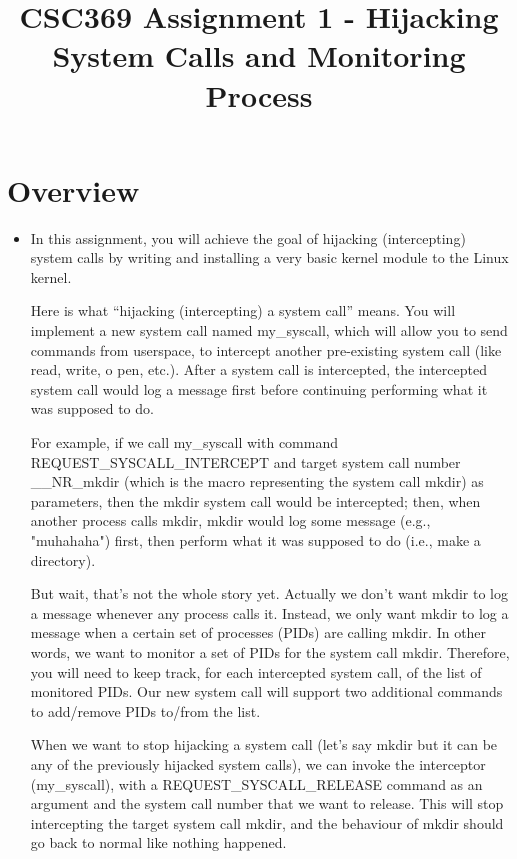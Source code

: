 \documentclass[12pt]{article}
\begin{document}
\title{CSC369 Assignment 1 - Hijacking System Calls and Monitoring Process}
\maketitle

\section{Overview}

\begin{itemize}
    \item

    In this assignment, you will achieve the goal of hijacking (intercepting)
    system calls by writing and installing a very basic kernel module to the Linux kernel.

    \bigskip

    Here is what ``hijacking (intercepting) a system call'' means. You will implement
    a new system call named my\_syscall, which will allow you to send commands from
    userspace, to intercept another pre-existing system call (like read, write, o
    pen, etc.). After a system call is intercepted, the intercepted system call
    would log a message first before continuing performing what it was supposed to do.

    \bigskip

    For example, if we call my\_syscall with command REQUEST\_SYSCALL\_INTERCEPT
    and target system call number \_\_NR\_mkdir (which is the macro representing the
    system call mkdir) as parameters, then the mkdir system call would be intercepted;
    then, when another process calls mkdir, mkdir would log some message (e.g.,
    "muhahaha") first, then perform what it was supposed to do (i.e., make a directory).

    \bigskip

    But wait, that's not the whole story yet. Actually we don't want mkdir to log
    a message whenever any process calls it. Instead, we only want mkdir to log
    a message when a certain set of processes (PIDs) are calling mkdir. In other
    words, we want to monitor a set of PIDs for the system call mkdir. Therefore,
    you will need to keep track, for each intercepted system call, of the list of
    monitored PIDs. Our new system call will support two additional commands to add/remove
    PIDs to/from the list.

    \bigskip

    When we want to stop hijacking a system call (let's say mkdir but it can be any
    of the previously hijacked system calls), we can invoke the interceptor
    (my\_syscall), with a REQUEST\_SYSCALL\_RELEASE command as an argument and the
    system call number that we want to release. This will stop intercepting the
    target system call mkdir, and the behaviour of mkdir should go back to normal
    like nothing happened.
\end{itemize}
\end{document}
